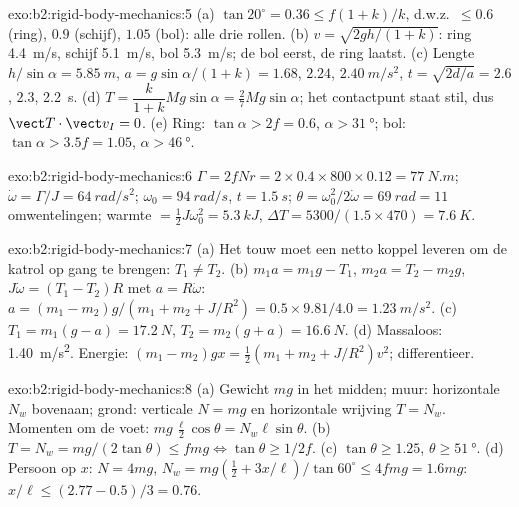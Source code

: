 \begin{solution}{exo:b2:rigid-body-mechanics:5}
(a) $\tan20^\circ = 0.36 \le f(1 + k)/k$, d.w.z.\ $\le 0.6$ (ring), $0.9$
(schijf), $1.05$ (bol): alle drie rollen. (b) $v = \sqrt{2gh/(1 + k)}$: ring
\qty{4.4}{m/s}, schijf \qty{5.1}{m/s}, bol \qty{5.3}{m/s}; de bol eerst, de
ring laatst. (c) Lengte $h/\sin\alpha = \qty{5.85}{m}$,
$a = g\sin\alpha/(1 + k) =
1.68$, $2.24$, $\qty{2.40}{m/s^2}$,
$t = \sqrt{2d/a} = 2.6$, $2.3$, \qty{2.2}{s}. (d)
$T = \dfrac{k}{1 + k}Mg\sin\alpha = \tfrac27Mg\sin\alpha$; het contactpunt
staat stil, dus $\vect T\cdot\vect v_I = 0$. (e) Ring:
$\tan\alpha >
2f = 0.6$, $\alpha > \qty{31}{\degree}$; bol:
$\tan\alpha > 3.5f = 1.05$, $\alpha > \qty{46}{\degree}$.
\end{solution}

\begin{solution}{exo:b2:rigid-body-mechanics:6}
$\Gamma = 2fNr = 2 \times 0.4 \times 800 \times 0.12 = \qty{77}{N.m}$;
$\dot\omega =
\Gamma/J = \qty{64}{rad/s^2}$; $\omega_0 = \qty{94}{rad/s}$,
$t = \qty{1.5}{s}$; $\theta = \omega_0^2/2\dot\omega = \qty{69}{rad} = 11$
omwentelingen; warmte $= \tfrac12J
\omega_0^2 = \qty{5.3}{kJ}$,
$\Delta T = 5300/(1.5 \times 470) = \qty{7.6}{K}$.
\end{solution}

\begin{solution}{exo:b2:rigid-body-mechanics:7}
(a) Het touw moet een netto koppel leveren om de katrol op gang te brengen:
$T_1 \ne T_2$. (b) $m_1a = m_1g - T_1$, $m_2a = T_2 - m_2g$,
$J\dot\omega = (T_1 - T_2)R$ met $a = R\dot\omega$:
$a = (m_1 - m_2)g/(m_1 + m_2 + J/R^2) = 0.5 \times 9.81/4.0 =
\qty{1.23}{m/s^2}$.
(c) $T_1 = m_1(g - a) = \qty{17.2}{N}$, $T_2 = m_2(g + a) =
\qty{16.6}{N}$.
(d) Massaloos: \qty{1.40}{m/s^2}. Energie:
$(m_1 - m_2)gx =
\tfrac12(m_1 + m_2 + J/R^2)v^2$; differentieer.
\end{solution}

\begin{solution}{exo:b2:rigid-body-mechanics:8}
(a) Gewicht $mg$ in het midden; muur: horizontale $N_w$ bovenaan; grond:
verticale $N = mg$ en horizontale wrijving $T = N_w$. Momenten om de voet:
$mg\,\tfrac{\ell}2\cos\theta = N_w\ell\sin\theta$. (b)
$T = N_w =
mg/(2\tan\theta) \le fmg \iff \tan\theta \ge 1/2f$. (c)
$\tan\theta \ge
1.25$, $\theta \ge \qty{51}{\degree}$. (d) Persoon op $x$:
$N = 4mg$, $N_w =
mg(\tfrac12 + 3x/\ell)/\tan60^\circ \le 4fmg = 1.6mg$:
$x/\ell \le (2.77 -
0.5)/3 = 0.76$.
\end{solution}

